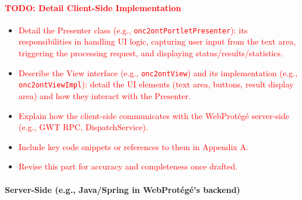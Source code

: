         \paragraph{\textcolor{red}{TODO: Detail Client-Side Implementation}}
        \begin{itemize}
            \item[\textcolor{red}{$\bullet$}] \textcolor{red}{Detail the Presenter class (e.g., \texttt{onc2ontPortletPresenter}): its responsibilities in handling UI logic, capturing user input from the text area, triggering the processing request, and displaying status/results/statistics.}
            \item[\textcolor{red}{$\bullet$}] \textcolor{red}{Describe the View interface (e.g., \texttt{onc2ontView}) and its implementation (e.g., \texttt{onc2ontViewImpl}): detail the UI elements (text area, buttons, result display area) and how they interact with the Presenter.}
            \item[\textcolor{red}{$\bullet$}] \textcolor{red}{Explain how the client-side communicates with the WebProtégé server-side (e.g., GWT RPC, DispatchService).}
            \item[\textcolor{red}{$\bullet$}] \textcolor{red}{Include key code snippets or references to them in Appendix A.}
            \item[\textcolor{red}{$\bullet$}] \textcolor{red}{Revise this part for accuracy and completeness once drafted.}
        \end{itemize}

        \paragraph{Server-Side (e.g., Java/Spring in WebProtégé's backend)}
